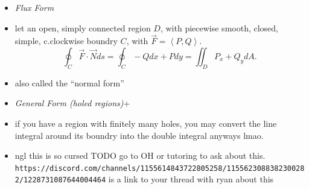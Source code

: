 \documentclass[11pt]{article}
\theoremstyle{definition}
\begin{document}
\begin{multicols}{2}
{\begin{itemize}
      \[ \text{Area}(D)=\iint_D1dA = \frac{1}{2}\oint_C -ydx+xdy\]
      TODO notes say ``left off p724 wtf''
      \item[] \emph{Flux Form}
      \item let an open, simply connected region $D$, with piecewise smooth, closed, simple, c.clockwise boundry $C$, with $\vec{F} = \left<P,Q\right>$.
      \[\oint_C\vec{F}\cdot\vec{N}ds = \oint_C -Qdx+Pdy = \iint_D P_x+Q_y dA.\]
      \item also called the ``normal form''
      \item[] \emph{General Form (holed regions)}+
      \item if you have a region with finitely many holes, you may convert the line integral around its boundry into the double integral anyways lmao.
      \item ngl this is so cursed TODO go to OH or tutoring to ask about this. \texttt{https://discord.com/channels/1155614843722805258/1155623088382300282/1228731087644004464} is a link to your thread with ryan about this
    \end{itemize}
  }
\end{multicols}
\end{document}
